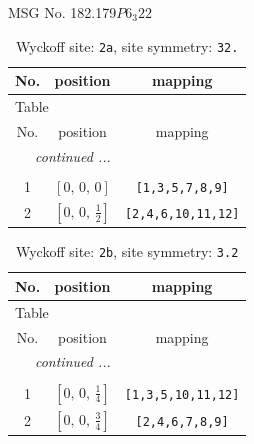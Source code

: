 \documentclass[fleqn,8pt]{jsarticle}
\begin{document}
\setcounter{MaxMatrixCols}{32}

\renewcommand{\tablename}{Table~}
\renewcommand{\figurename}{Figure~}
\begin{center}
\LARGE
MSG No. 182.179\quad$P6_{3}22$
\end{center}
\renewcommand{\arraystretch}{1.2}
\begin{longtable}{ccc}
\caption{Wyckoff site: {\tt 2a}, site symmetry: {\tt 32.}}
 \\
 \hline \hline
No. & position & mapping \\ \hline \endfirsthead

\multicolumn{2}{l}{\tablename\ \thetable{}} \\
 \hline \hline
No. & position & mapping \\ \hline \endhead

 \hline \hline
\multicolumn{2}{r}{\footnotesize\it continued ...} \\ \endfoot

 \hline \hline
\multicolumn{2}{r}{} \\ \endlastfoot

1 & $\left[ 0,\, 0,\, 0 \right]$ & {\tt [1,3,5,7,8,9]} \\ \hline
2 & $\left[ 0,\, 0,\, \frac{1}{2} \right]$ & {\tt [2,4,6,10,11,12]} \\
\end{longtable}
\renewcommand{\arraystretch}{1.2}
\begin{longtable}{ccc}
\caption{Wyckoff site: {\tt 2b}, site symmetry: {\tt 3.2}}
 \\
 \hline \hline
No. & position & mapping \\ \hline \endfirsthead

\multicolumn{2}{l}{\tablename\ \thetable{}} \\
 \hline \hline
No. & position & mapping \\ \hline \endhead

 \hline \hline
\multicolumn{2}{r}{\footnotesize\it continued ...} \\ \endfoot

 \hline \hline
\multicolumn{2}{r}{} \\ \endlastfoot

1 & $\left[ 0,\, 0,\, \frac{1}{4} \right]$ & {\tt [1,3,5,10,11,12]} \\ \hline
2 & $\left[ 0,\, 0,\, \frac{3}{4} \right]$ & {\tt [2,4,6,7,8,9]} \\
\end{longtable}
\renewcommand{\arraystretch}{1.2}
\end{document}

